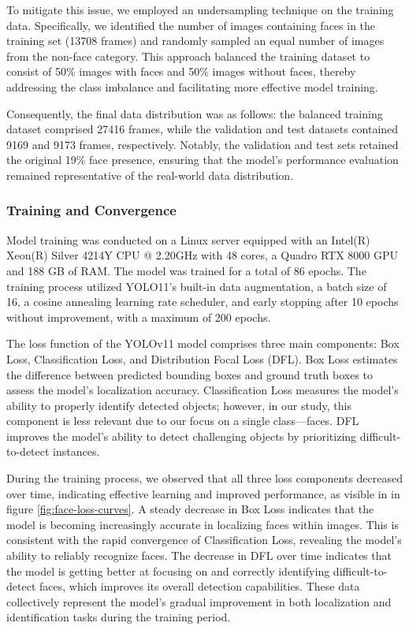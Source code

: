 \documentclass[
  man,floatsintext]{apa6}
\begin{document}
To mitigate this issue, we employed an undersampling technique on the training data. Specifically, we identified the number of images containing faces in the training set (13708 frames) and randomly sampled an equal number of images from the non-face category. This approach balanced the training dataset to consist of 50\% images with faces and 50\% images without faces, thereby addressing the class imbalance and facilitating more effective model training.

Consequently, the final data distribution was as follows: the balanced training dataset comprised 27416 frames, while the validation and test datasets contained 9169 and 9173 frames, respectively. Notably, the validation and test sets retained the original 19\% face presence, ensuring that the model's performance evaluation remained representative of the real-world data distribution.

\subsubsection{Training and Convergence}\label{training-and-convergence}

Model training was conducted on a Linux server equipped with an Intel(R) Xeon(R) Silver 4214Y CPU @ 2.20GHz with 48 cores, a Quadro RTX 8000 GPU and 188 GB of RAM. The model was trained for a total of 86 epochs. The training process utilized YOLO11's built-in data augmentation, a batch size of 16, a cosine annealing learning rate scheduler, and early stopping after 10 epochs without improvement, with a maximum of 200 epochs.

The loss function of the YOLOv11 model comprises three main components: Box Loss, Classification Loss, and Distribution Focal Loss (DFL). Box Loss estimates the difference between predicted bounding boxes and ground truth boxes to assess the model's localization accuracy. Classification Loss measures the model's ability to properly identify detected objects; however, in our study, this component is less relevant due to our focus on a single class---faces. DFL improves the model's ability to detect challenging objects by prioritizing difficult-to-detect instances.

During the training process, we observed that all three loss components decreased over time, indicating effective learning and improved performance, as visible in in figure \ref{fig:face-loss-curves}. A steady decrease in Box Loss indicates that the model is becoming increasingly accurate in localizing faces within images. This is consistent with the rapid convergence of Classification Loss, revealing the model's ability to reliably recognize faces. The decrease in DFL over time indicates that the model is getting better at focusing on and correctly identifying difficult-to-detect faces, which improves its overall detection capabilities. These data collectively represent the model's gradual improvement in both localization and identification tasks during the training period.
\end{document}
